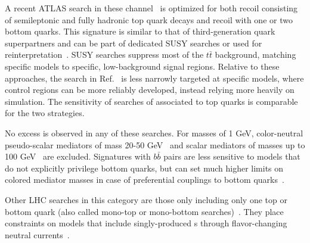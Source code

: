A recent ATLAS search in these channel~\cite{Aaboud:2017rzf} is optimized for both recoil consisting of semileptonic and fully hadronic top quark decays and recoil with one or two bottom quarks.
This signature is similar to that of third-generation quark superpartners and can be part of dedicated SUSY searches or used for reinterpretation~\cite{Aaboud:2017aeu,Sirunyan:2017leh}.
SUSY searches suppress most of the $t\bar{t}$ background, matching specific models to specific, low-background signal regions. 
Relative to these approaches, the search in Ref.~\cite{Aaboud:2017rzf} is less narrowly targeted at specific models, where control regions can be more reliably developed, instead relying more heavily on simulation.
The sensitivity of searches of \MET associated to top quarks is comparable for the two strategies. 

No excess is observed in any of these searches. 
For \IP masses of 1 GeV, color-neutral pseudo-scalar mediators of mass 20-50 GeV~\cite{Aaboud:2017aeu} and scalar mediators of masses up to 100 GeV~\cite{Sirunyan:2017leh} are excluded. %
Signatures with $b\bar{b}$ pairs are less sensitive to models that do not explicitly privilege bottom quarks, but can set much higher limits on colored mediator masses in case of preferential couplings to bottom quarks~\cite{Agrawal:2014una}. 


Other LHC searches in this category are those only including only one top or bottom quark (also called mono-top or mono-bottom searches)~\cite{Sirunyan:2018gka, Aad:2014wza}.
They place constraints on models that include singly-produced {\IP}s through flavor-changing neutral currents~\cite{Boucheneb:2014wza}.


